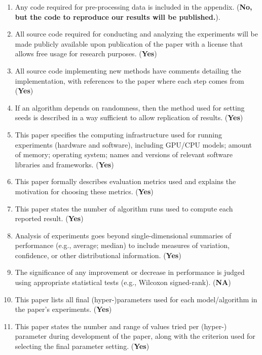 \begin{enumerate}
    \item Any code required for pre-processing data is included in the appendix. (\textbf{No, but the code to reproduce our results will be published.}).
    \item All source code required for conducting and analyzing the experiments will be made publicly available upon publication of the paper with a license that allows free usage for research purposes. (\textbf{Yes})
    \item All source code implementing new methods have comments detailing the implementation, with references to the paper where each step comes from (\textbf{Yes})
    \item If an algorithm depends on randomness, then the method used for setting seeds is described in a way sufficient to allow replication of results. (\textbf{Yes})
    \item This paper specifies the computing infrastructure used for running experiments (hardware and software), including GPU/CPU models; amount of memory; operating system; names and versions of relevant software libraries and frameworks. (\textbf{Yes})
    \item This paper formally describes evaluation metrics used and explains the motivation for choosing these metrics. (\textbf{Yes})
    \item This paper states the number of algorithm runs used to compute each reported result. (\textbf{Yes})
    \item Analysis of experiments goes beyond single-dimensional summaries of performance (e.g., average; median) to include measures of variation, confidence, or other distributional information. (\textbf{Yes})
    \item The significance of any improvement or decrease in performance is judged using appropriate statistical tests (e.g., Wilcoxon signed-rank). (\textbf{NA})
    \item This paper lists all final (hyper-)parameters used for each model/algorithm in the paper’s experiments. (\textbf{Yes})
    \item This paper states the number and range of values tried per (hyper-) parameter during development of the paper, along with the criterion used for selecting the final parameter setting. (\textbf{Yes})
\end{enumerate}